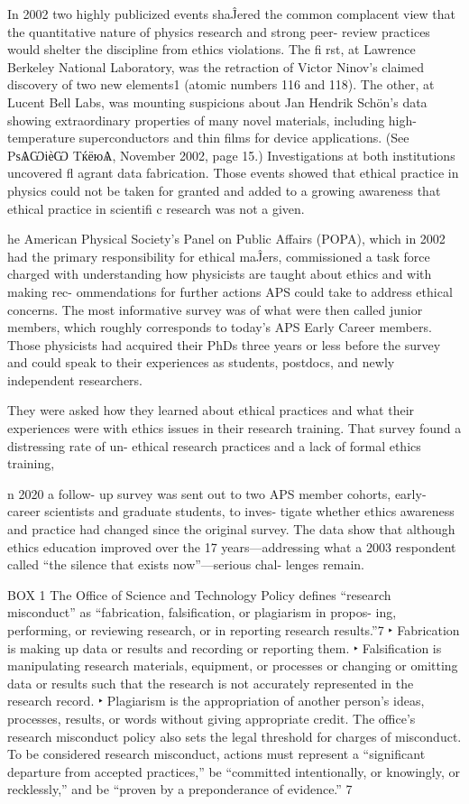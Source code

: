 In 2002 two highly publicized events shaĴered the common
complacent view that the quantitative nature of physics research
and strong peer- review practices would shelter the discipline
from ethics violations. The fi rst, at Lawrence Berkeley National
Laboratory, was the retraction of Victor Ninov’s claimed discovery
of two new elements1 (atomic numbers 116 and 118). The other, at Lucent
Bell Labs, was mounting suspicions about Jan Hendrik Schön’s data
showing extraordinary properties of many novel materials, including
high-temperature superconductors and thin films for device applications.
(See PѕѦѠіѐѠ TќёюѦ, November 2002, page 15.) Investigations at both
institutions uncovered fl agrant data fabrication. Those events showed
that ethical practice in physics could not be taken for granted and added
to a growing awareness that ethical practice in scientifi c research was
not a given.


he American Physical Society’s Panel
on Public Affairs (POPA), which in 2002
had the primary responsibility for ethical
maĴers, commissioned a task force charged
with understanding how physicists are
taught about ethics and with making rec-
ommendations for further actions APS
could take to address ethical concerns.
The most informative survey was
of what were then called junior members,
which roughly corresponds to today’s APS
Early Career members. Those physicists
had acquired their PhDs three years or less
before the survey and could speak to their
experiences as students, postdocs, and newly
independent researchers.

They were asked
how they learned about ethical practices and what their experiences were with ethics issues in their
research training. That survey found a distressing rate of un-
ethical research practices and a lack of formal ethics training,

n 2020 a follow- up survey was sent out to two APS member
cohorts, early- career scientists and graduate students, to inves-
tigate whether ethics awareness and practice had changed
since the original survey. The data show that although ethics
education improved over the 17 years—addressing what a 2003
respondent called “the silence that exists now”—serious chal-
lenges remain.


BOX 1
The Office of Science and Technology Policy defines “research
misconduct” as “fabrication, falsification, or plagiarism in propos-
ing, performing, or reviewing research, or in reporting research
results.”7
‣ Fabrication is making up data or results and recording or
reporting them.
‣ Falsification is manipulating research materials, equipment,
or processes or changing or omitting data or results such that the
research is not accurately represented in the research record.
‣ Plagiarism is the appropriation of another person’s ideas,
processes, results, or words without giving appropriate credit.
The office’s research misconduct policy also sets the legal
threshold for charges of misconduct. To be considered research
misconduct, actions must represent a “significant departure from
accepted practices,” be “committed intentionally, or knowingly, or
recklessly,” and be “proven by a preponderance of evidence.” 7


